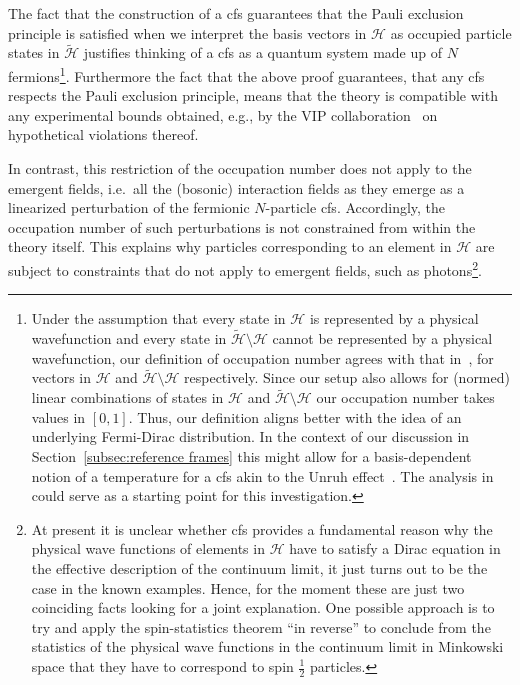 \documentclass[reqno,11pt]{amsart}
\renewcommand{\H}{\mathcal{H}}
\numberwithin{equation}{section}
\begin{document}
The fact that the construction of a \ac{cfs} guarantees that the Pauli exclusion principle is satisfied when we interpret the
basis vectors in $\H$ as occupied particle states in $\tilde{\H}$ justifies thinking of a \ac{cfs} as a quantum system
made up of $N$ fermions\footnote{
    Under the assumption that every state in $\H$ is represented by a physical wavefunction and every state in $\tilde{\H} \setminus \H$ cannot be represented by a physical wavefunction, our definition of occupation number agrees with that in~\cite[Section 5.9]{Finster2024}, for vectors in $\H$ and $\tilde{\H} \setminus \H$ respectively.
    Since our setup also allows for (normed) linear combinations of states in $\H$ and $\tilde{\H} \setminus \H$ our occupation number takes values in $[0,1]$.
    Thus, our definition aligns better with the idea of an underlying Fermi-Dirac distribution. 
    In the context of our discussion in Section~\ref{subsec:reference frames} this might allow for a basis-dependent notion of a temperature for a \ac{cfs} akin to the Unruh effect~\cite{Unruh}. The analysis in~\cite{finster2017fermionic} could serve as a starting point for this investigation. 
}. Furthermore the fact that the above proof guarantees, that any \ac{cfs} respects the Pauli exclusion principle, means that the theory is compatible with any experimental bounds obtained, e.g., by the VIP collaboration~\cite{baudis2024search,marton2015high,piscicchia2022strongest,piscicchia2023experimental} on hypothetical violations thereof. 

In contrast, this restriction of the occupation number does not apply to the emergent fields, i.e.~all the (bosonic) interaction fields as they emerge as a
linearized perturbation of the fermionic $N$-particle \ac{cfs}.
Accordingly, the occupation number of such perturbations is not constrained from within the theory itself.
This explains why particles corresponding to an element in $\H$ are subject to constraints that do not apply to emergent
fields, such as photons\footnote{
    At present it is unclear whether \ac{cfs} provides a fundamental reason why the physical wave functions of elements in $\H$
    have to satisfy a Dirac equation in the effective description of the continuum limit, it just turns out to be the case in
    the known examples.
    Hence, for the moment these are just two coinciding facts looking for a joint explanation.
    One possible approach is to try and apply the spin-statistics theorem ``in reverse'' to conclude from the statistics of the physical wave functions in the continuum limit in Minkowski space that they have to correspond to spin $\frac{1}{2}$ particles.
}.
\end{document}
